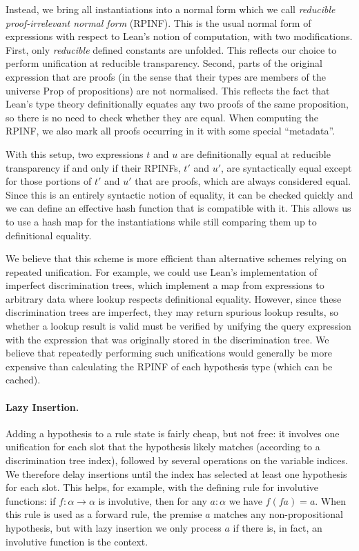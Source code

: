 \documentclass[runningheads]{llncs}
\newcommand{\Prop}{\ensuremath{\mathrm{Prop}}}
\begin{document}
Instead, we bring all instantiations into a normal form which we call \emph{reducible proof-irrelevant normal form} (RPINF).
This is the usual normal form of expressions with respect to Lean's notion of computation, with two modifications.
First, only \emph{reducible} defined constants are unfolded.
This reflects our choice to perform unification at reducible transparency.
Second, parts of the original expression that are proofs (in the sense that their types are members of the universe $\Prop$ of propositions) are not normalised.
This reflects the fact that Lean's type theory definitionally equates any two proofs of the same proposition, so there is no need to check whether they are equal.
When computing the RPINF, we also mark all proofs occurring in it with some special \enquote{metadata}.

With this setup, two expressions $t$ and $u$ are definitionally equal at reducible transparency if and only if their RPINFs, $t'$ and $u'$, are syntactically equal except for those portions of $t'$ and $u'$ that are proofs, which are always considered equal.
Since this is an entirely syntactic notion of equality, it can be checked quickly and we can define an effective hash function that is compatible with it.
This allows us to use a hash map for the instantiations while still comparing them up to definitional equality.

We believe that this scheme is more efficient than alternative schemes relying on repeated unification.
For example, we could use Lean's implementation of imperfect discrimination trees, which implement a map from expressions to arbitrary data where lookup respects definitional equality.
However, since these discrimination trees are imperfect, they may return spurious lookup results, so whether a lookup result is valid must be verified by unifying the query expression with the expression that was originally stored in the discrimination tree.
We believe that repeatedly performing such unifications would generally be more expensive than calculating the RPINF of each hypothesis type (which can be cached).

\paragraph{Lazy Insertion.}
Adding a hypothesis to a rule state is fairly cheap, but not free: it involves one unification for each slot that the hypothesis likely matches (according to a discrimination tree index), followed by several operations on the variable indices.
We therefore delay insertions until the index has selected at least one hypothesis for each slot.
This helps, for example, with the defining rule for involutive functions: if $f : α → α$ is involutive, then for any $a : α$ we have $f (f a) = a$.
When this rule is used as a forward rule, the premise $a$ matches any non-propositional hypothesis, but with lazy insertion we only process $a$ if there is, in fact, an involutive function is the context.
\end{document}
